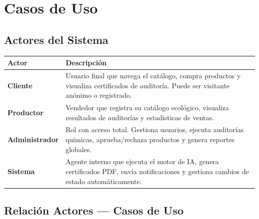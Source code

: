 \documentclass[12pt,a4paper]{article}
\begin{document}
\section{Casos de Uso}

\subsection{Actores del Sistema}

\begin{center}
\begin{tabular}{|L{2.8cm}|L{11.2cm}|}
\hline
{}
\color{white}\textbf{Actor} & \color{white}\textbf{Descripci\'on} \\
\hline
\textbf{Cliente} &
Usuario final que navega el cat\'alogo, compra productos y visualiza
certificados de auditor\'ia. Puede ser visitante an\'onimo o registrado. \\
\hline
\textbf{Productor} &
Vendedor que registra su cat\'alogo ecol\'ogico, visualiza resultados de
auditor\'ias y estad\'isticas de ventas. \\
\hline
\textbf{Administrador} &
Rol con acceso total. Gestiona usuarios, ejecuta auditor\'ias qu\'imicas,
aprueba/rechaza productos y genera reportes globales. \\
\hline
\textbf{Sistema} &
Agente interno que ejecuta el motor de IA, genera certificados PDF,
env\'ia notificaciones y gestiona cambios de estado autom\'aticamente. \\
\hline
\end{tabular}
\end{center}

\subsection{Relaci\'on Actores --- Casos de Uso}
\end{document}
